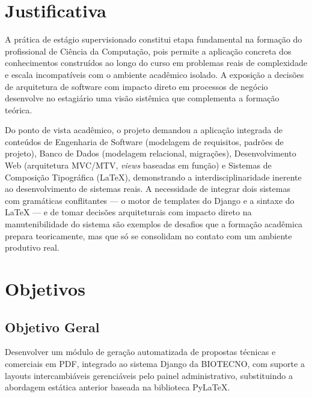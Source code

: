 \section{Justificativa}
\label{sec:justificativa}

A prática de estágio supervisionado constitui etapa fundamental na formação do profissional de Ciência da
Computação, pois permite a aplicação concreta dos conhecimentos construídos ao longo do curso em
problemas reais de complexidade e escala incompatíveis com o ambiente acadêmico isolado. A exposição a
decisões de arquitetura de software com impacto direto em processos de negócio desenvolve no estagiário
uma visão sistêmica que complementa a formação teórica.

Do ponto de vista acadêmico, o projeto demandou a aplicação integrada de conteúdos de Engenharia de
Software (modelagem de requisitos, padrões de projeto), Banco de Dados (modelagem relacional, migrações),
Desenvolvimento Web (arquitetura MVC/MTV, \textit{views} baseadas em função) e Sistemas de Composição
Tipográfica (\LaTeX{}), demonstrando a interdisciplinaridade inerente ao desenvolvimento de sistemas
reais. A necessidade de integrar dois sistemas com gramáticas conflitantes --- o motor de templates do
Django e a sintaxe do \LaTeX{} --- e de tomar decisões arquiteturais com impacto direto na
manutenibilidade do sistema são exemplos de desafios que a formação acadêmica prepara teoricamente,
mas que só se consolidam no contato com um ambiente produtivo real.

\section{Objetivos}
\label{sec:objetivos}

\subsection{Objetivo Geral}
\label{subsec:objective-geral}

Desenvolver um módulo de geração automatizada de propostas técnicas e comerciais em PDF, integrado ao
sistema Django da BIOTECNO, com suporte a layouts intercambiáveis gerenciáveis pelo painel administrativo,
substituindo a abordagem estática anterior baseada na biblioteca PyLaTeX.

